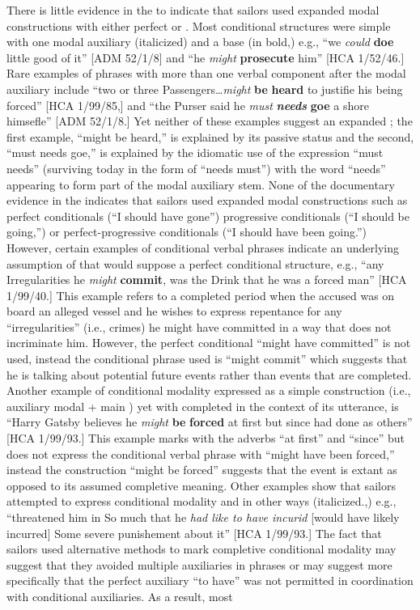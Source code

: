 There is little evidence in the  to indicate that sailors used expanded modal constructions with either perfect or . Most conditional structures were simple with one modal auxiliary (italicized) and a base  (in bold,) e.g., “we \textit{could} \textbf{doe} little good of it” [ADM 52/1/8] and “he \textit{might} \textbf{prosecute} him” [HCA 1/52/46.] Rare examples of  phrases with more than one verbal component after the modal auxiliary include “two or three Passengers…\textit{might} \textbf{be} \textbf{heard} to justifie his being forced” [HCA 1/99/85,] and “the Purser said he \textit{must} \textbf{\textit{needs}} \textbf{goe} a shore himsefle” [ADM 52/1/8.] Yet neither of these examples suggest an expanded ; the first example, “might be heard,” is explained by its passive status and the second, “must needs goe,” is explained by the idiomatic use of the expression “must needs” (surviving today in the form of “needs must”) with the word “needs” appearing to form part of the modal auxiliary stem. None of the documentary evidence in the  indicates that sailors used expanded modal constructions such as perfect conditionals (“I should have gone”) progressive conditionals (“I should be going,”) or perfect-progressive conditionals (“I should have been going.”) However, certain examples of conditional verbal phrases indicate an underlying assumption of  that would suppose a perfect conditional structure, e.g., “any Irregularities he \textit{might} \textbf{commit}, was the Drink that he was a forced man” [HCA 1/99/40.] This example refers to a completed period when the accused was on board an alleged  vessel and he wishes to express repentance for any “irregularities” (i.e., crimes) he might have committed in a way that does not incriminate him. However, the perfect conditional “might have committed” is not used, instead the conditional phrase used is “might commit” which suggests that he is talking about potential future events rather than events that are completed. Another example of conditional modality expressed as a simple construction (i.e., auxiliary modal + main ) yet with completed  in the context of its utterance, is “Harry Gatsby believes he \textit{might} \textbf{be} \textbf{forced} at first but since had done as others” [HCA 1/99/93.] This example marks  with the adverbs “at first” and “since” but does not express the conditional verbal phrase with  “might have been forced,” instead the construction “might be forced” suggests that the event is extant as opposed to its assumed completive meaning. Other examples show that sailors attempted to express conditional modality and  in other ways (italicized.,) e.g., “threatened him in So much that he \textit{had like to have incurid} [would have likely incurred] Some severe punishement about it” [HCA 1/99/93.] The fact that sailors used alternative methods to mark completive conditional modality may suggest that they avoided multiple auxiliaries in  phrases or may suggest more specifically that the perfect auxiliary “to have” was not permitted in coordination with conditional auxiliaries. As a result, most 